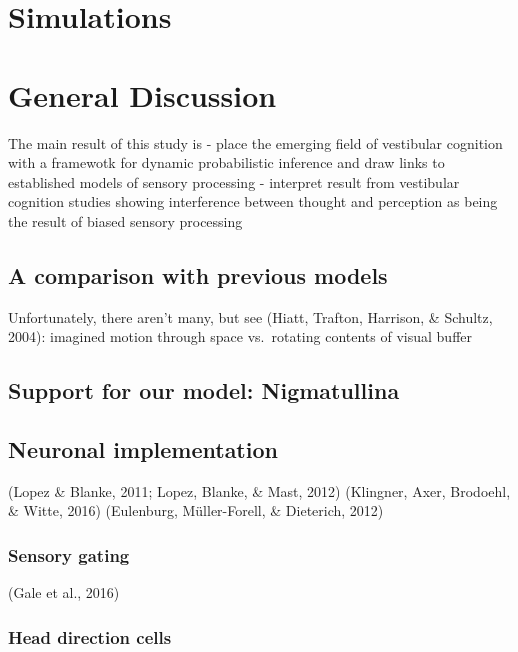 \documentclass[english,floatsintext,man]{apa6}
\theoremstyle{definition}
\theoremstyle{definition}
\theoremstyle{remark}
\begin{document}
\section{Simulations}\label{simulations}

\section{General Discussion}\label{general-discussion}

The main result of this study is - place the emerging field of
vestibular cognition with a framewotk for dynamic probabilistic
inference and draw links to established models of sensory processing -
interpret result from vestibular cognition studies showing interference
between thought and perception as being the result of biased sensory
processing

\subsection{A comparison with previous
models}\label{a-comparison-with-previous-models}

Unfortunately, there aren't many, but see (Hiatt, Trafton, Harrison, \&
Schultz, 2004): imagined motion through space vs.~rotating contents of
visual buffer

\subsection{Support for our model:
Nigmatullina}\label{support-for-our-model-nigmatullina}

\subsection{Neuronal implementation}\label{neuronal-implementation}

(Lopez \& Blanke, 2011; Lopez, Blanke, \& Mast, 2012) (Klingner, Axer,
Brodoehl, \& Witte, 2016) (Eulenburg, Müller-Forell, \& Dieterich, 2012)

\subsubsection{Sensory gating}\label{sensory-gating}

(Gale et al., 2016)

\subsubsection{Head direction cells}\label{head-direction-cells}
\end{document}
